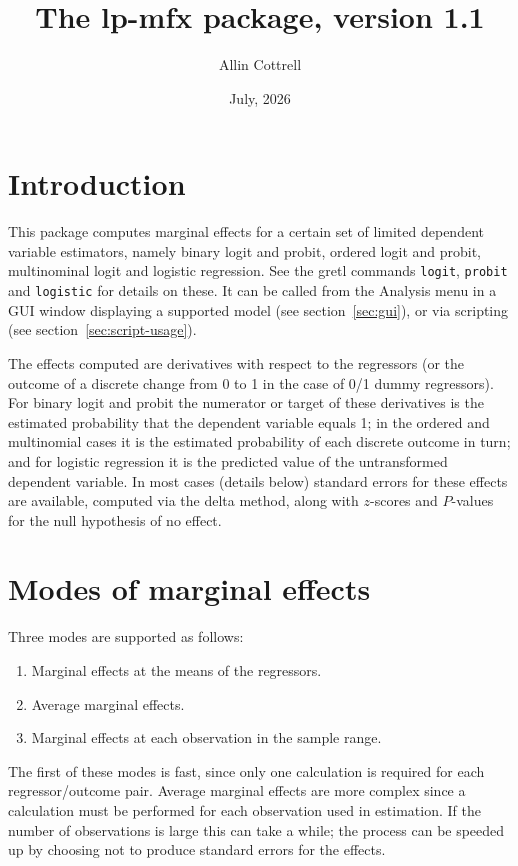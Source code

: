 \documentclass{article}
\begin{document}
\setlength{\parindent}{0pt}
\setlength{\parskip}{1ex}
\setcounter{secnumdepth}{2}

\newcommand{\argname}[1]{\textsl{#1}}
  
\title{The \textsf{lp-mfx} package, version 1.1}
\author{Allin Cottrell}
\date{July, 2026}
\maketitle

\section{Introduction}
\label{sec:intro}

This package computes marginal effects for a certain set of limited
dependent variable estimators, namely binary logit and probit, ordered
logit and probit, multinominal logit and logistic regression. See the
gretl commands \texttt{logit}, \texttt{probit} and \texttt{logistic}
for details on these. It can be called from the \textsf{Analysis} menu
in a GUI window displaying a supported model (see
section~\ref{sec:gui}), or via scripting (see
section~\ref{sec:script-usage}).

The effects computed are derivatives with respect to the regressors
(or the outcome of a discrete change from 0 to 1 in the case of 0/1
dummy regressors). For binary logit and probit the numerator or target
of these derivatives is the estimated probability that the dependent
variable equals 1; in the ordered and multinomial cases it is the
estimated probability of each discrete outcome in turn; and for
logistic regression it is the predicted value of the untransformed
dependent variable. In most cases (details below) standard errors for
these effects are available, computed via the delta method, along with
$z$-scores and $P$-values for the null hypothesis of no effect.

\section{Modes of marginal effects}
\label{sec:modes}

Three modes are supported as follows:
\begin{enumerate}
\item Marginal effects at the means of the regressors.
\item Average marginal effects.
\item Marginal effects at each observation in the sample range.
\end{enumerate}
The first of these modes is fast, since only one calculation is
required for each regressor/outcome pair. Average marginal effects are
more complex since a calculation must be performed for each
observation used in estimation. If the number of observations is large
this can take a while; the process can be speeded up by choosing not
to produce standard errors for the effects.
\end{document}
